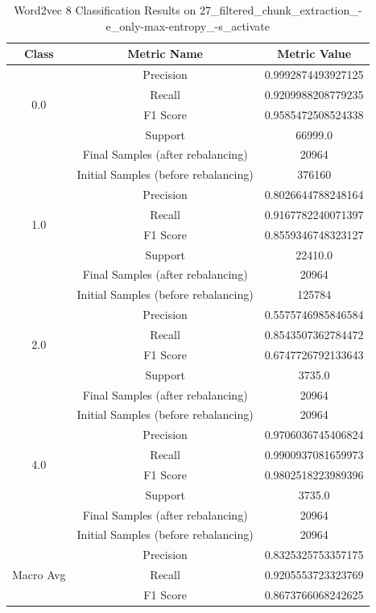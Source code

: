 \begin{longtable}{|c|c|c|}
\caption{Word2vec 8 Classification Results on 27\_filtered\_chunk\_extraction\_-e\_only-max-entropy\_-s\_activate} \label{tab:27_filtered_chunk_extraction_-e_only-max-entropy_-s_activate_word2vec_8_classifiers_results} \\
\hline
Class & Metric Name & Metric Value \\
\hline
\multirow{4}{*}{0.0} & Precision & 0.9992874493927125 \\
 & Recall & 0.9209988208779235 \\
 & F1 Score & 0.9585472508524338 \\
 & Support & 66999.0 \\
 & Final Samples (after rebalancing) & 20964 \\
 & Initial Samples (before rebalancing) & 376160 \\
\hline
\multirow{4}{*}{1.0} & Precision & 0.8026644788248164 \\
 & Recall & 0.9167782240071397 \\
 & F1 Score & 0.8559346748323127 \\
 & Support & 22410.0 \\
 & Final Samples (after rebalancing) & 20964 \\
 & Initial Samples (before rebalancing) & 125784 \\
\hline
\multirow{4}{*}{2.0} & Precision & 0.5575746985846584 \\
 & Recall & 0.8543507362784472 \\
 & F1 Score & 0.6747726792133643 \\
 & Support & 3735.0 \\
 & Final Samples (after rebalancing) & 20964 \\
 & Initial Samples (before rebalancing) & 20964 \\
\hline
\multirow{4}{*}{4.0} & Precision & 0.9706036745406824 \\
 & Recall & 0.9900937081659973 \\
 & F1 Score & 0.9802518223989396 \\
 & Support & 3735.0 \\
 & Final Samples (after rebalancing) & 20964 \\
 & Initial Samples (before rebalancing) & 20964 \\
\hline
\multirow{4}{*}{Macro Avg} & Precision & 0.8325325753357175 \\
 & Recall & 0.9205553723323769 \\
 & F1 Score & 0.8673766068242625 \\

\end{longtable}
